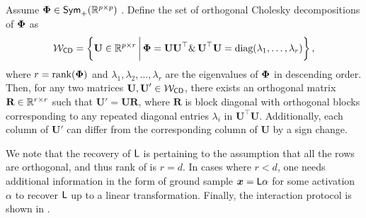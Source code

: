 \begin{lemma}\label{lem: ortho}
    Assume \( \pphi \in \symmp \) . Define the set of orthogonal Cholesky decompositions of \( \pphi \) as
    \[
        \cW_{\sf{CD}} = \left\{ \textbf{U} \in \reals^{p \times r} \,\bigg|\, \pphi = \textbf{U} \textbf{U}^\top \&\, \textbf{U}^\top \textbf{U} = \text{diag}(\lambda_1,\ldots, \lambda_r) \right\},
    \]
    where \( r = \text{rank}(\pphi) \) and \( \lambda_1, \lambda_2, \ldots, \lambda_r \) are the eigenvalues of $\pphi$ in descending order. Then, for any two matrices \( \textbf{U}, \textbf{U}' \in \cW_{\sf{CD}} \), there exists an orthogonal matrix \( \textbf{R} \in \reals^{r \times r} \) such that $\textbf{U}' = \textbf{U} \textbf{R}$, where \( \textbf{R} \) is block diagonal with orthogonal blocks corresponding to any repeated diagonal entries \( \lambda_i \) in \( \textbf{U}^\top \textbf{U} \). Additionally, each column of \( \textbf{U}' \) can differ from the corresponding column of \( \textbf{U} \) by a sign change.
\end{lemma}
We note that the recovery of $\sf{L}$ is pertaining to the assumption that all the rows are orthogonal, and thus rank of  is $r = d$. In cases where $r < d$, one needs additional information in the form of ground sample $\bx = \sf{L}\alpha$ for some activation $\alpha$ to recover $\sf{L}$ up to a linear transformation.
\hfill
Finally, the interaction protocol is shown in . 
